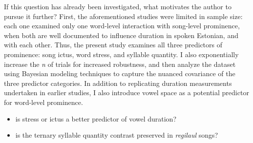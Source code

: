 If this question has already been investigated, what motivates the author to pursue it further? First, the aforementioned studies were limited in sample size: each one examined only one word-level interaction with song-level prominence, when both are well documented to influence duration in spoken Estonian, and with each other. Thus, the present study examines all three predictors of prominence: song ictus, word stress, and syllable quantity. I also exponentially increase the {\it n} of trials for increased robustness, and then analyze the dataset using Bayesian modeling techniques to capture the nuanced covariance of the three predictor categories. In addition to replicating duration measurements undertaken in earlier studies, I also introduce vowel space as a potential predictor for word-level prominence. 







 
 
\begin{itemize}
\item is stress or ictus a better predictor of vowel duration?
\item is the ternary syllable quantity contrast preserved in {\it regilaul} songs?
\end{itemize} 


